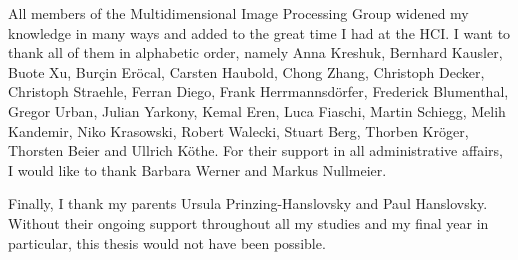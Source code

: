 All members of the Multidimensional Image Processing Group widened my knowledge in many ways and
added to the great time I had at the
HCI. I want to thank all of them in alphabetic order, namely
Anna Kreshuk,
Bernhard Kausler,
Buote Xu,
Bur\c{c}in Er\"ocal,
Carsten Haubold,
Chong Zhang,
Christoph Decker,
Christoph Straehle,
Ferran Diego,
Frank Herrmannsd\"orfer,
Frederick Blumenthal,
Gregor Urban,
Julian Yarkony,
Kemal Eren,
Luca Fiaschi,
Martin Schiegg,
Melih Kandemir,
Niko Krasowski,
Robert Walecki,
Stuart Berg,
Thorben Kr\"oger,
Thorsten Beier and
Ullrich K\"othe.
For their support in all administrative affairs, I would like to thank
Barbara Werner and Markus Nullmeier.

Finally, I thank my parents Ursula Prinzing-Hanslovsky and Paul Hanslovsky. Without their ongoing
support throughout all my studies and my final year in particular, this thesis would not have been
possible.

